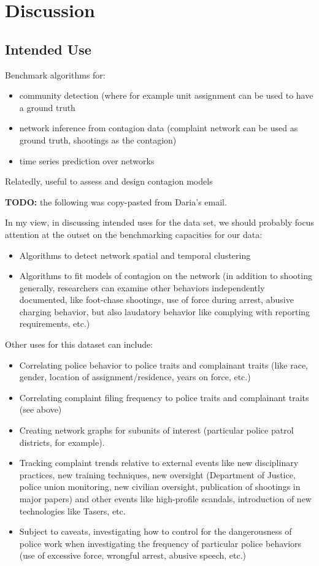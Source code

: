 \section{Discussion}

\subsection{Intended Use}
Benchmark algorithms for:
\begin{itemize}
	\item community detection (where for example unit assignment can be used to
		have a ground truth
	\item network inference from contagion data (complaint network can be used
		as ground truth, shootings as the contagion)
	\item time series prediction over networks
\end{itemize}

Relatedly, useful to assess and design contagion models


\textbf{TODO:} the following was copy-pasted from Daria's email.

In my view, in discussing intended uses for the data set, we should probably focus attention at the outset on the benchmarking capacities for our data:

\begin{itemize}
	\item Algorithms to detect network spatial and temporal clustering
	\item Algorithms to fit models of contagion on the network (in addition to shooting generally, researchers can examine other behaviors independently documented, like foot-chase shootings, use of force during arrest, abusive charging behavior, but also laudatory behavior like complying with reporting requirements, etc.)
\end{itemize}

Other uses for this dataset can include:

\begin{itemize}
	\item Correlating police behavior to police traits and complainant traits (like race, gender, location of assignment/residence, years on force, etc.)
	\item Correlating complaint filing frequency to police traits and complainant traits (see above)
	\item Creating network graphs for subunits of interest (particular police patrol districts, for example).
	\item Tracking complaint trends relative to external events like new disciplinary practices, new training techniques, new oversight (Department of Justice, police union monitoring, new civilian oversight, publication of shootings in major papers) and other events like high-profile scandals, introduction of new technologies like Tasers, etc.
	\item Subject to caveats, investigating how to control for the dangerousness of police work when investigating the frequency of particular police behaviors (use of excessive force, wrongful arrest, abusive speech, etc.)
\end{itemize}


